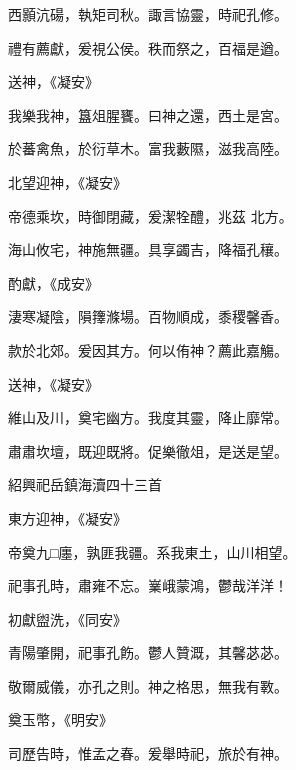 \begin{pinyinscope}
 西顥沆碭，執矩司秋。諏言協靈，時祀孔修。



 禮有薦獻，爰視公侯。秩而祭之，百福是遒。



 送神，《凝安》



 我樂我神，簋俎腥饔。曰神之還，西土是宮。



 於蕃禽魚，於衍草木。富我藪隰，滋我高陸。



 北望迎神，《凝安》



 帝德乘坎，時御閉藏，爰潔牷醴，兆茲
 北方。



 海山攸宅，神施無疆。具享蠲吉，降福孔穰。



 酌獻，《成安》



 淒寒凝陰，隕籜滌場。百物順成，黍稷馨香。



 款於北郊。爰因其方。何以侑神？薦此嘉觴。



 送神，《凝安》



 維山及川，奠宅幽方。我度其靈，降止靡常。



 肅肅坎壇，既迎既將。促樂徹俎，是送是望。



 紹興祀岳鎮海瀆四十三首



 東方迎神，《凝安》



 帝奠九□廛，孰匪我疆。系我東土，山川相望。



 祀事孔時，肅雍不忘。嶪峨蒙鴻，鬱哉洋洋！



 初獻盥洗，《同安》



 青陽肇開，祀事孔飭。鬱人贊溉，其馨苾苾。



 敬爾威儀，亦孔之則。神之格思，無我有斁。



 奠玉幣，《明安》



 司歷告時，惟孟之春。爰舉時祀，旅於有神。




\end{pinyinscope}
